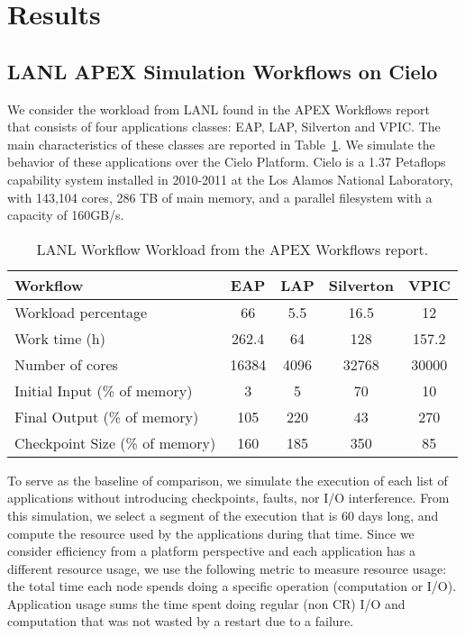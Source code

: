 
\section{Results}\label{sec:results}

\subsection{LANL APEX Simulation Workflows on Cielo}

We consider the workload from LANL found in the APEX Workflows
report~\cite{apex2016} that consists of four applications
classes: EAP, LAP, Silverton and VPIC. The main characteristics of
these classes are reported in Table~\ref{table:lanl}. We simulate the
behavior of these applications over the Cielo Platform. Cielo is a
1.37 Petaflops capability system installed in 2010-2011 at the Los
Alamos National Laboratory, with 143,104 cores, 286 TB of main memory,
and a parallel filesystem with a capacity of 160GB/s.

\begin{table}
\begin{tabular}{|l|c|c|c|c|}
\hline
 Workflow & EAP & LAP & Silverton & VPIC \\\hline
Workload percentage & 66 & 5.5 & 16.5 & 12 \\\hline
Work time (h) & 262.4 & 64 & 128 & 157.2 \\\hline
Number of cores & 16384 & 4096 & 32768 & 30000 \\\hline
Initial Input (\% of memory) &  3 & 5 & 70 & 10 \\\hline
Final Output (\% of memory) & 105 & 220 & 43 & 270 \\\hline
Checkpoint Size (\% of memory) & 160 & 185 & 350 & 85 \\\hline
\end{tabular}
\caption{LANL Workflow Workload from the APEX Workflows report.\label{table:lanl}}
\end{table}

To serve as the baseline of comparison, we simulate the execution of
each list of applications without introducing checkpoints, faults, nor
I/O interference. From this simulation, we select a segment of the
execution that is 60 days long, and compute the resource
used by the applications during that time. Since we consider
efficiency from a platform perspective and each application has a
different resource usage, we use the following metric to measure
resource usage: the total time each node spends doing a specific
operation (computation or I/O). Application usage sums the time spent
doing regular (non CR) I/O and computation that was not wasted by a
restart due to a failure.

